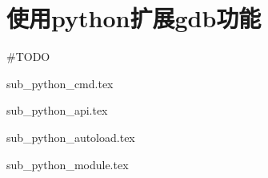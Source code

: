 \section{使用python扩展gdb功能}

\#TODO

{sub_python_cmd.tex}

{sub_python_api.tex}

{sub_python_autoload.tex}

{sub_python_module.tex}

